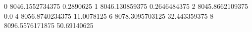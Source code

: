 0 8046.1552734375 0.2890625
1 8046.130859375 0.2646484375
2 8045.8662109375 0.0
4 8056.8740234375 11.0078125
6 8078.3095703125 32.443359375
8 8096.5576171875 50.69140625
